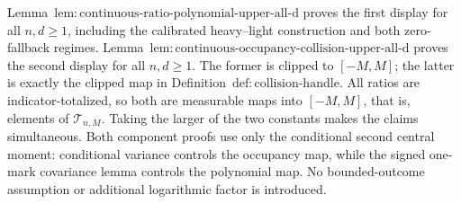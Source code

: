 Lemma~\(\mathrm{lem:continuous\text{-}ratio\text{-}polynomial\text{-}upper\text{-}all\text{-}d}\) proves the first display for all \(n,d\ge1\), including the calibrated heavy--light construction and both zero-fallback regimes.  Lemma~\(\mathrm{lem:continuous\text{-}occupancy\text{-}collision\text{-}upper\text{-}all\text{-}d}\) proves the second display for all \(n,d\ge1\).  The former is clipped to \([-M,M]\); the latter is exactly the clipped map in Definition~\(\mathrm{def:collision\text{-}handle}\).  All ratios are indicator-totalized, so both are measurable maps into \([-M,M]\), that is, elements of \(\mathcal T_{n,M}\).  Taking the larger of the two constants makes the claims simultaneous.  Both component proofs use only the conditional second central moment: conditional variance controls the occupancy map, while the signed one-mark covariance lemma controls the polynomial map.  No bounded-outcome assumption or additional logarithmic factor is introduced.